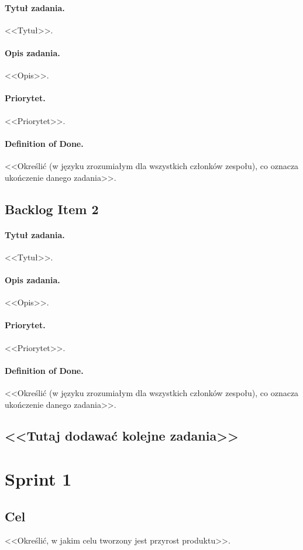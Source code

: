 \documentclass[a4paper]{article}
\begin{document}
\paragraph{Tytuł zadania.} <<Tytuł>>.
\paragraph{Opis zadania.} <<Opis>>.
\paragraph{Priorytet.} <<Priorytet>>.
\paragraph{Definition of Done.} <<Określić (w języku zrozumiałym dla wszystkich członków zespołu), co oznacza ukończenie danego zadania>>.

\subsection{Backlog Item 2}
\paragraph{Tytuł zadania.} <<Tytuł>>.
\paragraph{Opis zadania.} <<Opis>>.
\paragraph{Priorytet.} <<Priorytet>>.
\paragraph{Definition of Done.} <<Określić (w języku zrozumiałym dla wszystkich członków zespołu), co oznacza ukończenie danego zadania>>.

\subsection*{<<Tutaj dodawać kolejne zadania>>}

\section{Sprint 1}
\subsection{Cel} <<Określić, w jakim celu tworzony jest przyrost produktu>>.
\end{document}
